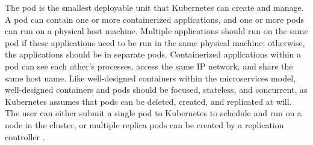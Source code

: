 The pod is the smallest deployable unit that Kubernetes can create and
manage. A pod can contain one or more
containerized applications, and one or more pods can run on a physical host
machine. Multiple applications should run on the same pod
if these applications need to be run in the same
physical machine; otherwise, the applications should be in separate pods.
Containerized applications within a pod can see each other's processes,
access the same IP network, and share the same host name. Like well-designed
containers within the microservices model, well-designed containers and pods should be
focused, stateless, and concurrent, as Kubernetes assumes that pods can be deleted,
created, and replicated at will. The user can either submit a
single pod to Kubernetes to schedule and run on a node in the cluster, or
multiple replica pods
can be created by a replication controller \cite{k8s-pods}.
